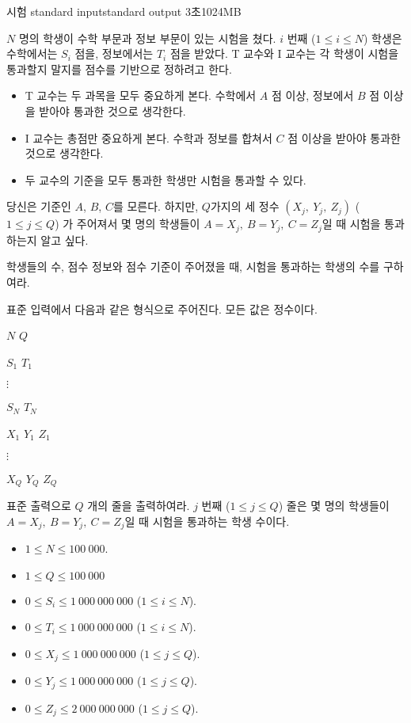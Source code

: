 \begin{problem}{시험}
	{standard input}{standard output}
	{3초}{1024MB}{}
	
	$N$ 명의 학생이 수학 부문과 정보 부문이 있는 시험을 쳤다. $i$ 번째 ($1 \le i \le N$) 학생은 수학에서는 $S_i$ 점을, 정보에서는 $T_i$ 점을 받았다. T 교수와 I 교수는 각 학생이 시험을 통과할지 말지를 점수를 기반으로 정하려고 한다.
	
	\begin{itemize}
		\item T 교수는 두 과목을 모두 중요하게 본다. 수학에서 $A$ 점 이상, 정보에서 $B$ 점 이상을 받아야 통과한 것으로 생각한다.
		\item I 교수는 총점만 중요하게 본다. 수학과 정보를 합쳐서 $C$ 점 이상을 받아야 통과한 것으로 생각한다.
		\item 두 교수의 기준을 모두 통과한 학생만 시험을 통과할 수 있다.
	\end{itemize}

	당신은 기준인 $A$, $B$, $C$를 모른다. 하지만, $Q$가지의 세 정수 $(X_j,\ Y_j,\ Z_j)$ ($1 \le j \le Q$) 가 주어져서 몇 명의 학생들이 $A=X_j,\ B=Y_j,\ C=Z_j$일 때 시험을 통과하는지 알고 싶다.
	
	학생들의 수, 점수 정보와 점수 기준이 주어졌을 때, 시험을 통과하는 학생의 수를 구하여라.

	\InputFile
	
	표준 입력에서 다음과 같은 형식으로 주어진다. 모든 값은 정수이다.

	$N$ $Q$
	
	$S_1$ $T_1$
	
	$\vdots$
	
	$S_N$ $T_N$

	$X_1$ $Y_1$ $Z_1$

	$\vdots$
	
	$X_Q$ $Y_Q$ $Z_Q$

	
	\OutputFile
	
	표준 출력으로 $Q$ 개의 줄을 출력하여라. $j$ 번째 ($1 \le j \le Q$) 줄은 몇 명의 학생들이 $A=X_j,\ B=Y_j,\ C=Z_j$일 때 시험을 통과하는 학생 수이다.
	
	\Constraints
	
	\begin{itemize}
	
	\item $1 \le N \le 100\ 000$.
	\item $1 \le Q \le 100\ 000$
	\item $0 \le S_i \le 1\ 000\ 000\ 000$ ($1 \le i \le N$).
	\item $0 \le T_i \le 1\ 000\ 000\ 000$ ($1 \le i \le N$).
	\item $0 \le X_j \le 1\ 000\ 000\ 000$ ($1 \le j \le Q$).
	\item $0 \le Y_j \le 1\ 000\ 000\ 000$ ($1 \le j \le Q$).
	\item $0 \le Z_j \le 2\ 000\ 000\ 000$ ($1 \le j \le Q$).
		

\end{itemize}
\end{problem}
